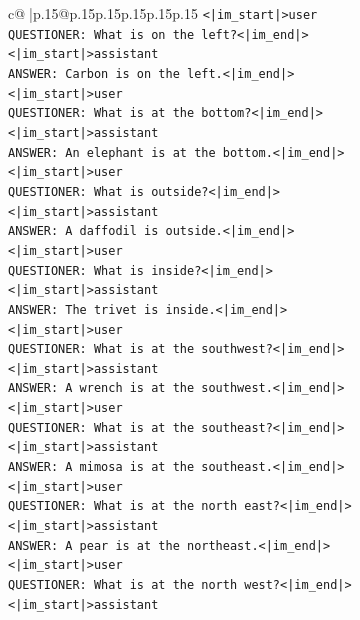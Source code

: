 \documentclass{article}
\begin{document}
{\begin{supertabular}{c@{$\;$}|p{.15\linewidth}@{}p{.15\linewidth}p{.15\linewidth}p{.15\linewidth}p{.15\linewidth}p{.15\linewidth}}
{{{\texttt{<|im\_start|>user} \\
\texttt{QUESTIONER: What is on the left?<|im\_end|>} \\
\texttt{<|im\_start|>assistant} \\
\texttt{ANSWER: Carbon is on the left.<|im\_end|>} \\
\texttt{<|im\_start|>user} \\
\texttt{QUESTIONER: What is at the bottom?<|im\_end|>} \\
\texttt{<|im\_start|>assistant} \\
\texttt{ANSWER: An elephant is at the bottom.<|im\_end|>} \\
\texttt{<|im\_start|>user} \\
\texttt{QUESTIONER: What is outside?<|im\_end|>} \\
\texttt{<|im\_start|>assistant} \\
\texttt{ANSWER: A daffodil is outside.<|im\_end|>} \\
\texttt{<|im\_start|>user} \\
\texttt{QUESTIONER: What is inside?<|im\_end|>} \\
\texttt{<|im\_start|>assistant} \\
\texttt{ANSWER: The trivet is inside.<|im\_end|>} \\
\texttt{<|im\_start|>user} \\
\texttt{QUESTIONER: What is at the southwest?<|im\_end|>} \\
\texttt{<|im\_start|>assistant} \\
\texttt{ANSWER: A wrench is at the southwest.<|im\_end|>} \\
\texttt{<|im\_start|>user} \\
\texttt{QUESTIONER: What is at the southeast?<|im\_end|>} \\
\texttt{<|im\_start|>assistant} \\
\texttt{ANSWER: A mimosa is at the southeast.<|im\_end|>} \\
\texttt{<|im\_start|>user} \\
\texttt{QUESTIONER: What is at the north east?<|im\_end|>} \\
\texttt{<|im\_start|>assistant} \\
\texttt{ANSWER: A pear is at the northeast.<|im\_end|>} \\
\texttt{<|im\_start|>user} \\
\texttt{QUESTIONER: What is at the north west?<|im\_end|>} \\
\texttt{<|im\_start|>assistant} \\
}}}
\end{supertabular}}
\end{document}
